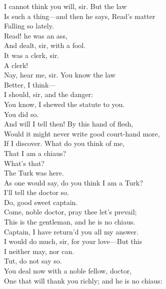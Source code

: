 \documentclass[a4paper,oneside]{memoir}
\begin{document}
\begin{drama*}
\facespeaks I cannot think you will, sir. But the law\\
Is such a thing---and then he says, Read's matter\\
Falling so lately.\\
\dapperspeaks {} Read! he was an ass,\\
And dealt, sir, with a fool.\\
\facespeaks {} It was a clerk, sir.\\
\dapperspeaks A clerk!\\
\facespeaks {} Nay, hear me, sir. You know the law\\
Better, I think---\\
\dapperspeaks {} I should, sir, and the danger:\\
You know, I shewed the statute to you.\\
\facespeaks You did so.\\
\dapperspeaks {} And will I tell then! By this hand of flesh,\\
Would it might never write good court-hand more,\\
If I discover. What do you think of me,\\
That I am a chiaus?\\
\facespeaks {} What's that?\\
\dapperspeaks {} The Turk was here.\\
As one would say, do you think I am a Turk?\\
\facespeaks I'll tell the doctor so.\\
\dapperspeaks {} Do, good sweet captain.\\
\facespeaks Come, noble doctor, pray thee let's prevail;\\
This is the gentleman, and he is no chiaus.\\
\subtlespeaks Captain, I have return'd you all my answer.\\
I would do much, sir, for your love---But this\\
I neither may, nor can.\\
\facespeaks {} Tut, do not say so.\\
You deal now with a noble fellow, doctor,\\
One that will thank you richly; and he is no chiaus:\\

\end{drama*}
\end{document}
